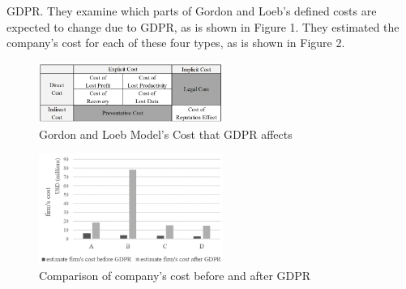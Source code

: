 \documentclass[11pt,english]{article}
\begin{document}
GDPR. They examine which parts of Gordon and Loeb’s defined costs \cite{gordon2002economics} are expected to change due to GDPR, as is shown in Figure 1. They estimated the company’s cost for each of these four types, as is shown in Figure 2.
\begin{figure}[htp]
    \centering
    \includegraphics[width=6cm]{costs}
    \caption{Gordon and Loeb Model’s Cost that GDPR affects}
    \label{fig:costs}
\end{figure}
\begin{figure}[htp]
    \centering
    \includegraphics[width=6cm]{comparation}
    \caption{Comparison of company’s cost before and after GDPR}
    \label{fig:comparation}
\end{figure}
\end{document}
